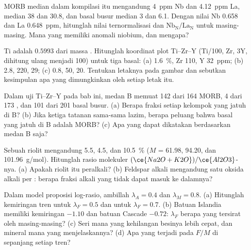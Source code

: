 \begin{exercise}[$\star\star$]\label{exo:b2:magmatic-series:6}
MORB median dalam kompilasi itu mengandung \qty{4}{ppm} Nb dan \qty{4.12}{ppm} La,
 median 38 dan 30.8, dan basal busur median 3 dan 6.1. Dengan nilai
 Nb 0.658 dan La \qty{0.648}{ppm}, hitunglah nilai ternormalisasi
dan $\mathrm{Nb_N}/\mathrm{La_N}$ untuk masing-masing. Mana yang memiliki anomali niobium, dan mengapa?
\end{exercise}

\begin{exercise}[$\star\star$]\label{exo:b2:magmatic-series:7}
Ti adalah $0.5993$ dari massa . Hitunglah koordinat plot Ti--Zr--Y
(Ti/100, Zr, $3\mathrm Y$, dihitung ulang menjadi 100) untuk tiga basal: (a) 
\qty{1.6}{\percent}, Zr 110, Y \qty{32}{ppm}; (b) 2.8, 220, 29; (c) 0.8, 50, 20. Tentukan letaknya
pada gambar dan sebutkan kesimpulan apa yang dimungkinkan oleh setiap letak itu.
\end{exercise}

\begin{exercise}[$\star\star$]\label{exo:b2:magmatic-series:8}
Dalam uji Ti--Zr--Y pada bab ini, medan B memuat 142 dari 164 MORB, 4 dari 173
, dan 101 dari 201 basal busur. (a) Berapa fraksi setiap kelompok yang jatuh
di B? (b) Jika ketiga tatanan sama-sama lazim, berapa peluang bahwa
basal yang jatuh di B adalah MORB? (c) Apa yang dapat dikatakan berdasarkan medan B saja?
\end{exercise}

\begin{exercise}[$\star\star$]\label{exo:b2:magmatic-series:9}
Sebuah riolit mengandung  5.5,  4.5, dan  \qty{10.5}{\percent} ($M$ =
61.98, 94.20, dan \qty{101.96}{g/mol}). Hitunglah rasio molekuler $(\ce{Na2O +
K2O})/\ce{Al2O3}$-nya. (a) Apakah riolit itu peralkali? (b) Feldspar alkali mengandung satu
oksida alkali per : berapa fraksi alkali yang tidak dapat masuk ke dalamnya?
\end{exercise}

\begin{exercise}[$\star\star\star$]\label{exo:b2:magmatic-series:10}
Dalam model proposisi log-rasio, ambillah $\lambda_A = 0.4$ dan $\lambda_M =
0.8$. (a) Hitunglah kemiringan tren untuk $\lambda_F = 0.5$ dan untuk $\lambda_F =
0.7$. (b) Batuan Islandia memiliki kemiringan $-1.10$ dan batuan Cascade
$-0.72$: $\lambda_F$ berapa yang tersirat oleh masing-masing? (c) Seri mana yang kehilangan besinya lebih cepat,
dan mineral mana yang menjelaskannya? (d) Apa yang terjadi pada $F/M$ di sepanjang setiap tren?
\end{exercise}

